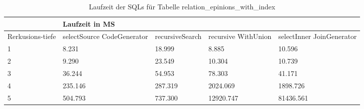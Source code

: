 \begin{table}[H]
	\centering
	\begin{tabular}{l|l|l|l|l|l|}
		\cline{2-6}
		& \multicolumn{5}{|l|}{Laufzeit in MS}                                                                                                                                                  \\ \hline
		\multicolumn{1}{|l|}{\multirow{2}{2cm}{Rerkusions-tiefe}} & \multicolumn{2}{|l|}{\multirow{2}{3cm}{selectSource CodeGenerator}} & \multirow{2}{2.8cm}{recursiveSearch} & \multirow{2}{2.5cm}{recursive WithUnion} & \multirow{2}{2.5cm}{selectInner JoinGenerator} \\
		\multicolumn{1}{|l|}{}
		& \multicolumn{2}{|l|}{}                                           &                                  &                                     &                                           \\ \hline
		
		
\multicolumn{1}{|l|}{1}                                 & \multicolumn{2}{l|}{8.231}                                       & 18.999                                                & 8.885                                                     & 10.596                                                          \\ \hline
\multicolumn{1}{|l|}{2}                                 & \multicolumn{2}{l|}{9.290}                                       & 23.549                                                & 10.304                                                    & 10.739                                                          \\ \hline
\multicolumn{1}{|l|}{3}                                 & \multicolumn{2}{l|}{36.244}                                      & 54.953                                                & 78.303                                                    & 41.171                                                          \\ \hline
\multicolumn{1}{|l|}{4}                                 & \multicolumn{2}{l|}{235.146}                                     & 287.319                                               & 2024.069                                                  & 1898.726                                                        \\ \hline
\multicolumn{1}{|l|}{5}                                 & \multicolumn{2}{l|}{504.793}                                     & 737.300                                               & 12920.747                                                 & 81436.561                                                       \\ \hline

	\end{tabular}
	\caption{Laufzeit der SQLs für Tabelle relation\_epinions\_with\_index}
\end{table}

